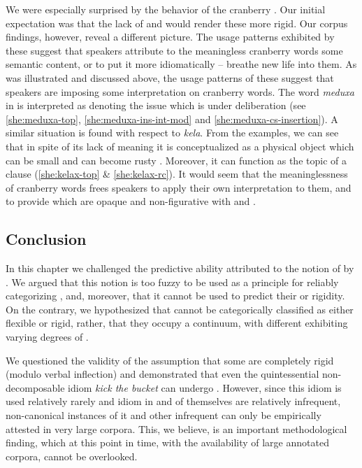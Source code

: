 \documentclass[output=paper]{langsci/langscibook}
\begin{document}
We were especially surprised by the behavior of the cranberry . Our initial expectation was that the lack of  and  would render these  more rigid. Our corpus findings, however, reveal a different picture. The usage patterns exhibited by these  suggest that speakers attribute to the meaningless cranberry words some semantic content, or to put it more idiomatically -- breathe new life into them. As was illustrated and discussed above, the usage patterns of these  suggest that speakers are imposing some interpretation on cranberry words. The word \textit{meduxa} in  is interpreted as denoting the issue which is under deliberation (see \ref{she:meduxa-top}, \ref{she:meduxa-ins-int-mod} and \ref{she:meduxa-cs-insertion}). A similar situation is found with respect to \textit{kela{\het}}. From the examples, we can see that in spite of its lack of meaning it is conceptualized as a physical object which can be small  and can become rusty . Moreover, it can function as the topic of a clause (\ref{she:kelax-top} \& \ref{she:kelax-rc}). It would seem that the meaninglessness of cranberry words frees speakers to apply their own interpretation  to them, and to provide  which are opaque and non-figurative with  and .




\subsection{Conclusion}


In this chapter we challenged the predictive ability attributed to the notion of  by \citet{nunberg94}. We argued that this notion is too fuzzy to be used as a principle for reliably categorizing , and, moreover, that it cannot be used to predict their  or rigidity. On the contrary, we hypothesized that  cannot be categorically classified as either flexible or rigid, rather, that they occupy a continuum, with different  exhibiting varying degrees of .

We questioned the validity of the assumption that some  are completely rigid (modulo verbal inflection) and demonstrated that even the quintessential non-decomposable idiom \textit{kick the bucket} can undergo . However, since this idiom is used relatively rarely and idiom  in and of themselves are relatively infrequent, non-canonical instances of it and other infrequent  can only be empirically attested in very large corpora. This, we believe, is an important methodological finding, which at this point in time, with the availability of large annotated corpora, cannot be overlooked.
\end{document}
